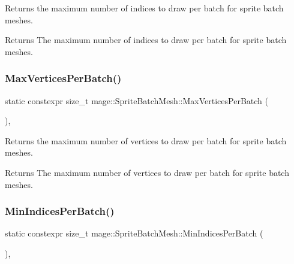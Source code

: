 Returns the maximum number of indices to draw per batch for sprite batch meshes.

\begin{DoxyReturn}{Returns}
The maximum number of indices to draw per batch for sprite batch meshes. 
\end{DoxyReturn}
\hypertarget{classmage_1_1_sprite_batch_mesh_a63c6b47e82be3175891ceb41847ed64d}{}\label{classmage_1_1_sprite_batch_mesh_a63c6b47e82be3175891ceb41847ed64d} 
\subsubsection{\texorpdfstring{Max\+Vertices\+Per\+Batch()}{MaxVerticesPerBatch()}}
{\footnotesize\ttfamily static constexpr size\+\_\+t mage\+::\+Sprite\+Batch\+Mesh\+::\+Max\+Vertices\+Per\+Batch (\begin{DoxyParamCaption}{ }\end{DoxyParamCaption})\hspace{0.3cm}{\ttfamily [static]}, {\ttfamily [noexcept]}}

Returns the maximum number of vertices to draw per batch for sprite batch meshes.

\begin{DoxyReturn}{Returns}
The maximum number of vertices to draw per batch for sprite batch meshes. 
\end{DoxyReturn}
\hypertarget{classmage_1_1_sprite_batch_mesh_af97c5b660417a70f9a0365c74279ef3e}{}\label{classmage_1_1_sprite_batch_mesh_af97c5b660417a70f9a0365c74279ef3e} 
\subsubsection{\texorpdfstring{Min\+Indices\+Per\+Batch()}{MinIndicesPerBatch()}}
{\footnotesize\ttfamily static constexpr size\+\_\+t mage\+::\+Sprite\+Batch\+Mesh\+::\+Min\+Indices\+Per\+Batch (\begin{DoxyParamCaption}{ }\end{DoxyParamCaption})\hspace{0.3cm}{\ttfamily [static]}, {\ttfamily [noexcept]}}

